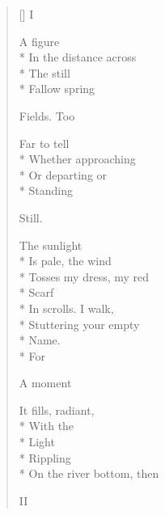 \label{ch:dogwood_tree}
\settowidth{\versewidth}{Earthward.                      The dogwood}
\begin{verse}[\versewidth]
 \qquad I

A figure\\*
In the distance     across\\*
The still\\*
Fallow spring

Fields.    Too

Far to tell\\*
Whether approaching\\*
Or departing or\\*
Standing

Still.

The sunlight\\*
Is pale, the wind\\*
Tosses my dress, my red\\*
Scarf\\*
In scrolls.    I walk,\\*
Stuttering your empty\\*
Name.\\*
For

A moment

It fills, radiant,\\*
With the\\*
Light\\*
Rippling\\*
On the river bottom, then

 \qquad II


\end{verse}
